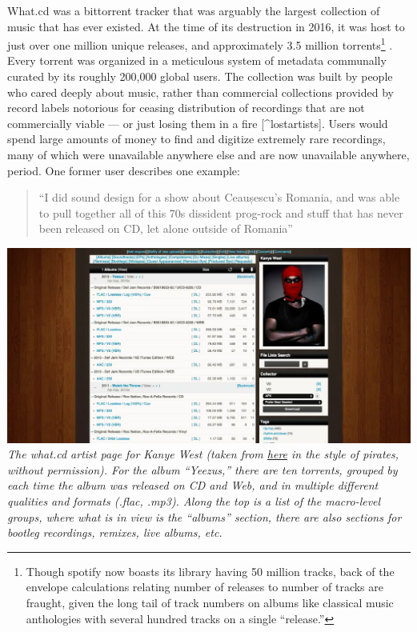 \documentclass[10pt]{article}
\begin{document}
\begin{multicols}{2}
What.cd was a bittorrent tracker that was arguably the largest
collection of music that has ever existed. At the time of its
destruction in 2016, it was host to just over one million unique
releases, and approximately 3.5 million torrents\footnote{Though spotify
  now boasts its library having 50 million tracks, back of the envelope
  calculations relating number of releases to number of tracks are
  fraught, given the long tail of track numbers on albums like classical
  music anthologies with several hundred tracks on a single ``release.''}
\cite{dunhamWhatCDLegacy2018} . Every torrent was organized in a
meticulous system of metadata communally curated by its roughly 200,000
global users. The collection was built by people who cared deeply about
music, rather than commercial collections provided by record labels
notorious for ceasing distribution of recordings that are not
commercially viable --- or just losing them in a fire \cite{rosenDayMusicBurned2019} {[}\^{}lostartists{]}. Users would spend
large amounts of money to find and digitize extremely rare recordings,
many of which were unavailable anywhere else and are now unavailable
anywhere, period. One former user describes one example:

\begin{quote}
``I did sound design for a show about Ceaușescu's Romania, and was able
to pull together all of this 70s dissident prog-rock and stuff that has
never been released on CD, let alone outside of Romania'' \cite{sonnadEulogyWhatCd2016} 
\end{quote}

\includegraphics[width=\linewidth]{../assets/images/kanye-what.png} \emph{The
what.cd artist page for Kanye West (taken from
\href{https://qz.com/840661/what-cd-is-gone-a-eulogy-for-the-greatest-music-collection-in-the-world/}{here}
in the style of pirates, without permission). For the album ``Yeezus,''
there are ten torrents, grouped by each time the album was released on
CD and Web, and in multiple different qualities and formats (.flac,
.mp3). Along the top is a list of the macro-level groups, where what is
in view is the ``albums'' section, there are also sections for bootleg
recordings, remixes, live albums, etc.}


\end{multicols}
\end{document}

